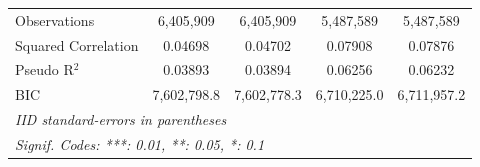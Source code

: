 \begin{tabular}{lcccc}
   Observations               & 6,405,909       & 6,405,909       & 5,487,589       & 5,487,589\\  
   Squared Correlation        & 0.04698         & 0.04702         & 0.07908         & 0.07876\\  
   Pseudo R$^2$               & 0.03893         & 0.03894         & 0.06256         & 0.06232\\  
   BIC                        & 7,602,798.8     & 7,602,778.3     & 6,710,225.0     & 6,711,957.2\\  
   \midrule \midrule
   \multicolumn{5}{l}{\emph{IID standard-errors in parentheses}}\\
   \multicolumn{5}{l}{\emph{Signif. Codes: ***: 0.01, **: 0.05, *: 0.1}}\\
\end{tabular}
\par\endgroup


